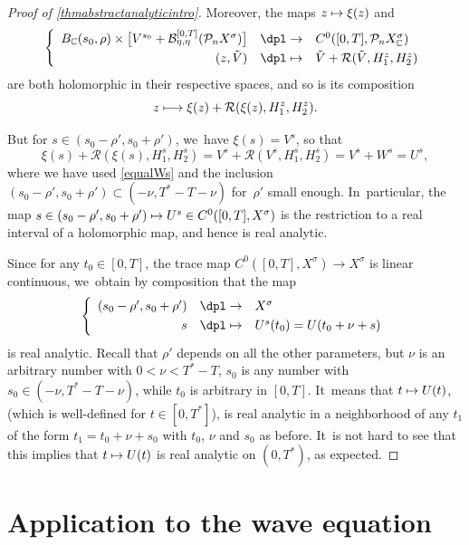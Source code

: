 \documentclass[JEP,XML,SOM,Unicode,published]{cedram}
\newcommand\mto{\mathchoice{\longmapsto}{\mapsto}{\mapsto}{\mapsto}}
\theoremstyle{definition}
\let\mc\mathcal
\newcommand{\B}{\mc{B}}
\renewcommand{\P}{\mathcal{P}}
\begin{document}
\begin{proof}[Proof of \cref{thmabstractanalyticintro}]
Moreover, the maps $z\mto \xi(z)$ and
\begin{align*}
\left\{\begin{array}{rcl}
B_{\mathbb{C}}(s_0, \rho)\times \bigl[V^{s_0}+ \B_{\eta,\eta}^{[0,T]}(\P_n X^{\sigma})\bigr]&\dpl\to& C^0([0, T], \P_n X_{\mathbb{C}}^\sigma)\\[3pt]
(z,\Tilde{V})&\dpl\mto&\Tilde{V}+ \mathcal{R}(\Tilde{V},H_{1}^z,H_{2}^z)
\end{array}\right.
\end{align*}
are both holomorphic in their respective spaces, and so is its composition\vspace*{-3pt}
\[
z\mto \xi(z)+\mathcal{R}(\xi(z),H_{1}^z,H_{2}^z).
\]

But for $s\in (s_0-\rho',s_0+\rho')$, we~have $\xi(s)=V^s$, so that
\[
\xi(s)+\mathcal{R}(\xi(s),H_{1}^s,H_{2}^s)=V^s+\mathcal{R}(V^s,H_{1}^s,H_{2}^s)=V^s+W^s=U^s,
\]
where we have used \eqref{equalWs} and the inclusion $(s_0-\rho',s_0+\rho')\subset (-\nu,T^*-T-\nu)$ for~$\rho'$ small enough. In~particular, the map $s\in (s_0-\rho',s_0+\rho')\mto U^s\in C^0([0, T], X^\sigma)$ is the restriction to a real interval of a holomorphic map, and hence is real analytic.

Since for any $t_0\in [0,T]$, the trace map $C^0([0, T], X^\sigma)\to X^\sigma$ is linear continuous, we~obtain by composition that the map\vspace*{-3pt}
\begin{align*}
\left\{\begin{array}{rcl}
(s_0-\rho',s_0+\rho')&\dpl\to& X^\sigma\\[3pt]
s&\dpl\mto&U^s(t_0)=U(t_0+\nu+s)
\end{array}\right.
\end{align*}
is real analytic. Recall that $\rho'$ depends on all the other parameters, but $\nu$ is an arbitrary number with $0<\nu<T^*-T$, $s_0$ is any number with $s_0\in (-\nu,T^*-T-\nu)$, while $t_0$ is arbitrary in $[0,T]$. It~means that $t\mto U(t)$, (which is well-defined for $t\in [0,T^*]$), is real analytic in a neighborhood of any $t_1$ of the form $t_1=t_0+\nu+s_0$ with $t_0$, $\nu$ and $s_0$ as before. It~is not hard to see that this implies that $t\mto U(t)$ is real analytic on $(0,T^*)$, as expected.
\end{proof}

\section{Application to the wave equation}\label{SEC:wave-eq}
\end{document}

